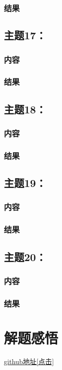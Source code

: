 \documentclass{article}
\begin{document}
\subsubsection{结果}  
\vspace{1cm}
\subsection{主题17：}  
\subsubsection{内容}
\subsubsection{结果}  
\vspace{1cm}
\subsection{主题18：}  
\subsubsection{内容}
\subsubsection{结果}  
\vspace{1cm}
\subsection{主题19：}  
\subsubsection{内容}
\subsubsection{结果}  
\vspace{1cm}
\subsection{主题20：}  
\subsubsection{内容}
\subsubsection{结果}  
\newpage
\thispagestyle{empty}
\section{解题感悟}  
\href{https://github.com/coff-sug/system_development.git}{github地址[点击]}
\end{document}
